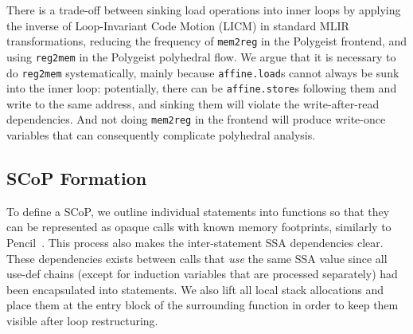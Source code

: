 \documentclass[sigplan]{acmart}
\newcommand{\icode}[1]{{\texttt {#1}}}
\newcommand{\tool}{Polygeist\xspace}
\newcommand{\scop}{SCoP\xspace}
\begin{document}



There is a trade-off between sinking load operations into inner loops by applying the inverse of Loop-Invariant Code Motion (LICM) in standard MLIR transformations, reducing the frequency of \icode{mem2reg} in the \tool frontend, and using \icode{reg2mem} in the \tool polyhedral flow.
We argue that it is necessary to do \icode{reg2mem} systematically, mainly because \icode{affine.load}s cannot always be sunk into the inner loop: potentially, there can be \icode{affine.store}s following them and write to the same address, and sinking them will violate the write-after-read dependencies.
And not doing \icode{mem2reg} in the frontend will produce write-once variables that can consequently complicate polyhedral analysis. 

\subsection{\scop Formation}
To define a \scop, we outline individual statements into functions so that they can be represented as opaque calls with known memory footprints, similarly to Pencil~\cite{pencil}.
This process also makes the inter-statement SSA dependencies clear. These dependencies exists between calls that \emph{use} the same SSA value since all use-def chains (except for induction variables that are processed separately) had been encapsulated into statements.
We also lift all local stack allocations and place them at the entry block of the surrounding function in order to keep them visible after loop restructuring.
\end{document}
